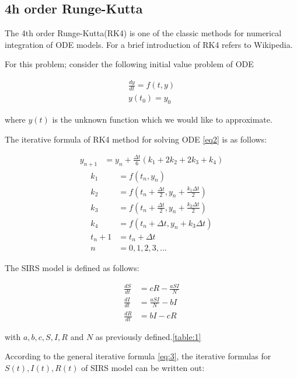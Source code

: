 \subsection{4h order Runge-Kutta}


The 4th order Runge-Kutta(RK4)  is one of the classic methods for numerical integration of ODE models. For a brief introduction of RK4 refers to Wikipedia.

For this problem; consider the following initial value problem of ODE

\begin{align}
\frac{dy}{dt} = f(t,y) \\ \label{eq2}
y(t_0) = y_0
\end{align}

where $y(t)$ is the unknown function which we would like to approximate.

The iterative formula of RK4 method for solving ODE \ref{eq2} is as follows:

\begin{align}
y_{n+1} &= y_n + \frac{\Delta t}{6}(k_1 + 2k_2 + 2k_3 + k_4) \label{eq:3}
\end{align}
\begin{align*}
k_1 &= f(t_n,y_n)\\
k_2 &= f(t_n + \frac{\Delta t}{2}, y_n + \frac{k_1\Delta t}{2})\\
k_3 &= f(t_n + \frac{\Delta t}{2}, y_n + \frac{k_2\Delta t}{2})\\
k_4 &= f(t_n + \Delta t, y_n + k_3 \Delta t)\\
t_n +1 &= t_n + \Delta t\\
n &= 0,1,2,3,...
\end{align*}



The SIRS model is defined as follows:

\begin{align*}
\frac{dS}{dt} &= cR - \frac{aSI}{N}\\
\frac{dI}{dt} &= \frac{aSI}{N} - bI\\
\frac{dR}{dt} &= bI - cR
\end{align*}

with $a, b, c, S, I, R$ and $N$ as previously defined.\ref{table:1}

According to the general iterative formula \ref{eq:3}, the iterative formulas for $S(t), I(t), R(t)$ of SIRS model can be written out: 

